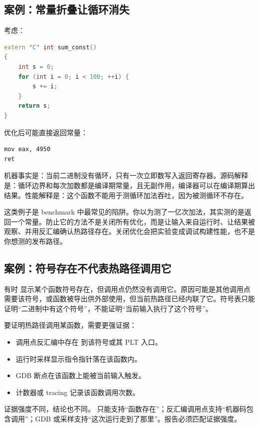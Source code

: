 \subsection{案例：常量折叠让循环消失}

考虑：

\begin{lstlisting}[language=C++]
extern "C" int sum_const()
{
    int s = 0;
    for (int i = 0; i < 100; ++i) {
        s += i;
    }
    return s;
}
\end{lstlisting}

优化后可能直接返回常量：

\begin{lstlisting}
mov eax, 4950
ret
\end{lstlisting}

机器事实是：当前二进制没有循环，只有一次立即数写入返回寄存器。源码解释是：循环边界和每次加数都是编译期常量，且无副作用，编译器可以在编译期算出结果。性能解释是：这个函数不能用于测循环加法吞吐，因为被测循环不存在。

这类例子是 benchmark 中最常见的陷阱。你以为测了一亿次加法，其实测的是返回一个常量。防止它的方法不是关闭所有优化，而是让输入来自运行时、让结果被观察、并用反汇编确认热路径存在。关闭优化会把实验变成调试构建性能，也不是你想测的发布路径。

\subsection{案例：符号存在不代表热路径调用它}

有时  显示某个函数符号存在，但调用点仍然没有调用它。原因可能是其他调用点需要该符号，或函数被导出供外部使用，但当前热路径已经内联了它。符号表只能证明“二进制中有这个符号”，不能证明“当前输入执行了这个符号”。

要证明热路径调用某函数，需要更强证据：

\begin{itemize}
  \item 调用点反汇编中存在  到该符号或其 PLT 入口。
  \item 运行时采样显示指令指针落在该函数内。
  \item GDB 断点在该函数上能被当前输入触发。
  \item 计数器或 tracing 记录该函数调用次数。
\end{itemize}

证据强度不同，结论也不同。  只能支持“函数存在”；反汇编调用点支持“机器码包含调用”；GDB 或采样支持“这次运行走到了那里”。报告必须匹配证据强度。

